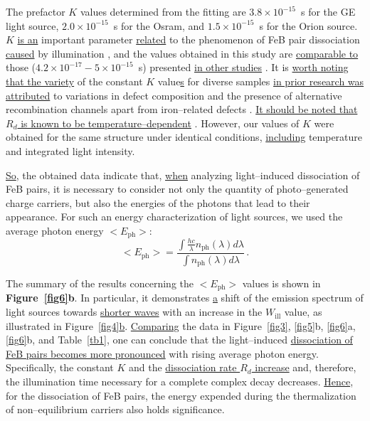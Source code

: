 \documentclass{WileyMSP-template}
\begin{document}
The prefactor $K$ values determined from the fitting are
$3.8\times10^{-15}$~s for the GE light source,
$2.0\times10^{-15}$~s for the Osram, and
$1.5\times10^{-15}$~s for the Orion source.
$K$ \textcolor[rgb]{0.00,0.07,1.00}{\uline{is an}} important parameter \textcolor[rgb]{0.00,0.07,1.00}{\uline{related}} to the phenomenon of FeB pair dissociation \textcolor[rgb]{0.00,0.07,1.00}{\uline{caused}} by illumination \cite{FeBKin2019},
and the values obtained in this study are \textcolor[rgb]{0.00,0.07,1.00}{\uline{comparable to}} those ($4.2\times10^{-17}-5\times10^{-15}$~s) presented \textcolor[rgb]{0.00,0.07,1.00}{\uline{in other studies}} \cite{FeBLight2,FeBAssJAP2014,FeBKin2019}.
It is \textcolor[rgb]{0.00,0.07,1.00}{\uline{worth noting that the variety}} of the constant $K$ value\textcolor[rgb]{0.00,0.07,1.00}{\uline{s}} for diverse samples 
\textcolor[rgb]{0.00,0.07,1.00}{\uline{in prior research was attributed}}
to variations in defect composition and the presence of alternative recombination channels apart from iron--related defects \cite{FeBLight2,FeBAssJAP2014}.
\textcolor[rgb]{0.00,0.07,1.00}{\uline{It should be noted that $R_d$ is known to be temperature--dependent}} \cite{Lagowskii1993}.
However, our values of $K$ were obtained for the same structure under identical conditions, \textcolor[rgb]{0.00,0.07,1.00}{\uline{including}} temperature and integrated light intensity.

\textcolor[rgb]{0.00,0.07,1.00}{\uline{So}}, the obtained data indicate that, \textcolor[rgb]{0.00,0.07,1.00}{\uline{when}} analyzing light--induced dissociation of FeB pairs,
it is necessary to consider not only the quantity of photo--generated charge carriers,
but also the energies of the photons that lead to their appearance.
For such an energy characterization of light sources, we used the average photon energy $<E_\mathrm{ph}>$:
\begin{equation}
\label{eqEaver}
<E_\mathrm{ph}>=\frac{\int \frac{hc}{\lambda}n_\mathrm{ph}(\lambda)d\lambda}{\int n_\mathrm{ph}(\lambda)d\lambda}\,.
\end{equation}


The summary of the results concerning the $<E_\mathrm{ph}>$ values is shown in \textbf{Figure~\ref{fig6}b}.
In particular, it demonstrates \textcolor[rgb]{0.00,0.07,1.00}{\uline{a}} shift of the emission spectrum of light sources
towards \textcolor[rgb]{0.00,0.07,1.00}{\uline{shorter waves}} with an increase in the $W_\mathrm{ill}$ value, as illustrated in Figure~\ref{fig4}\textcolor[rgb]{0.00,0.07,1.00}{\uline{b}}.
\textcolor[rgb]{0.00,0.07,1.00}{\uline{Comparing}} the data in Figure~\ref{fig3}, \ref{fig5}b, \ref{fig6}a, \ref{fig6}b, and Table~\ref{tb1}, one can conclude that
the light--induced \textcolor[rgb]{0.00,0.07,1.00}{\uline{dissociation of FeB pairs becomes more pronounced}} with rising average photon energy.
Specifically, the constant $K$ and the \textcolor[rgb]{0.00,0.07,1.00}{\uline{dissociation rate $R_d$ increase}} and, therefore, the illumination time necessary for a complete complex decay decreases.
\textcolor[rgb]{0.00,0.07,1.00}{\uline{Hence}}, for the dissociation of FeB pairs, the energy expended during the thermalization of non--equilibrium carriers also holds significance.
\end{document}
